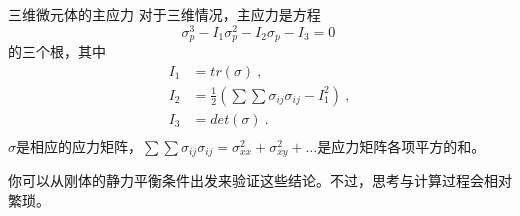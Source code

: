 \begin{example}{三维微元体的主应力}
对于三维情况，主应力是方程 
$$
\sigma_p^3-I_1\sigma_p^2-I_2\sigma_p-I_3=0~
$$
的三个根，其中
$$
\begin{aligned}
I_1&=tr(\sigma)~,\\
I_2&=\frac{1}{2} ({\sum \sum \sigma_{ij} \sigma_{ij} -I_1^2})~,\\
I_3&=det(\sigma)~.\\
\end{aligned}
$$
$\sigma$是相应的应力矩阵，$\sum \sum \sigma_{ij} \sigma_{ij}=\sigma_{xx}^2+\sigma_{xy}^2+...$是应力矩阵各项平方的和。
\end{example}
你可以从刚体的静力平衡条件出发来验证这些结论。不过，思考与计算过程会相对繁琐。
